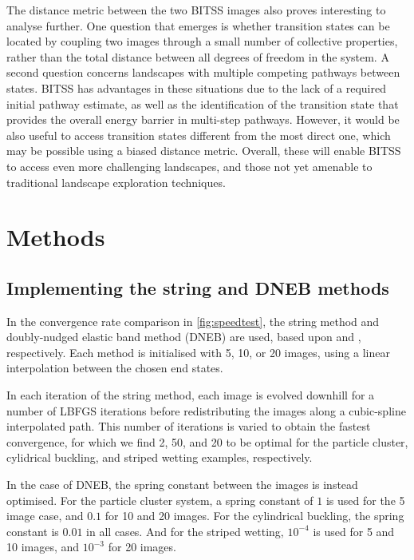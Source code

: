 \documentclass[twocolumn,10pt]{revtex4}
\begin{document}
The distance metric between the two BITSS images also proves interesting to analyse further.
One question that emerges is whether transition states can be located by coupling two images through a small number of collective properties, rather than the total distance between all degrees of freedom in the system.
A second question concerns landscapes with multiple competing pathways between states.
BITSS has advantages in these situations due to the lack of a required initial pathway estimate, as well as the identification of the transition state that provides the overall energy barrier in multi-step pathways.
However, it would be also useful to access transition states different from the most direct one, which may be possible using a biased distance metric.
Overall, these will enable BITSS to access even more challenging landscapes, and those not yet amenable to traditional landscape exploration techniques.


\section{Methods}

\subsection{Implementing the string and DNEB methods}
In the convergence rate comparison in \cref{fig:speedtest}, the string method and doubly-nudged elastic band method (DNEB) are used, based upon \cite{E2007} and \cite{Trygubenko2004}, respectively.
Each method is initialised with 5, 10, or 20 images, using a linear interpolation between the chosen end states.

In each iteration of the string method, each image is evolved downhill for a number of LBFGS iterations before redistributing the images along a cubic-spline interpolated path.
This number of iterations is varied to obtain the fastest convergence, for which we find 2, 50, and 20 to be optimal for the particle cluster, cylidrical buckling, and striped wetting examples, respectively.

In the case of DNEB, the spring constant between the images is instead optimised.
For the particle cluster system, a spring constant of $1$ is used for the 5 image case, and $0.1$ for 10 and 20 images.
For the cylindrical buckling, the spring constant is $0.01$ in all cases.
And for the striped wetting, $10^{-4}$ is used for 5 and 10 images, and $10^{-3}$ for 20 images.
\end{document}
